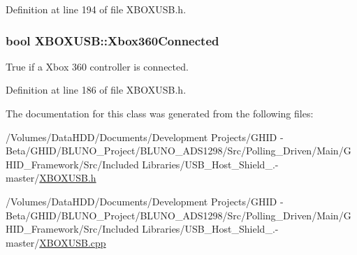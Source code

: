 \-Definition at line 194 of file \-X\-B\-O\-X\-U\-S\-B.\-h.

\hypertarget{class_x_b_o_x_u_s_b_a1c779ae5483a2f73426650242a37d868}{
\subsubsection[{\-Xbox360\-Connected}]{\setlength{\rightskip}{0pt plus 5cm}bool {\bf \-X\-B\-O\-X\-U\-S\-B\-::\-Xbox360\-Connected}}}\label{class_x_b_o_x_u_s_b_a1c779ae5483a2f73426650242a37d868}
\-True if a \-Xbox 360 controller is connected. 

\-Definition at line 186 of file \-X\-B\-O\-X\-U\-S\-B.\-h.



\-The documentation for this class was generated from the following files\-:\begin{DoxyCompactItemize}
\item 
/\-Volumes/\-Data\-H\-D\-D/\-Documents/\-Development Projects/\-G\-H\-I\-D -\/ Beta/\-G\-H\-I\-D/\-B\-L\-U\-N\-O\-\_\-\-Project/\-B\-L\-U\-N\-O\-\_\-\-A\-D\-S1298/\-Src/\-Polling\-\_\-\-Driven/\-Main/\-G\-H\-I\-D\-\_\-\-Framework/\-Src/\-Included Libraries/\-U\-S\-B\-\_\-\-Host\-\_\-\-Shield\-\_.-\/master/\hyperlink{_x_b_o_x_u_s_b_8h}{\-X\-B\-O\-X\-U\-S\-B.\-h}\item 
/\-Volumes/\-Data\-H\-D\-D/\-Documents/\-Development Projects/\-G\-H\-I\-D -\/ Beta/\-G\-H\-I\-D/\-B\-L\-U\-N\-O\-\_\-\-Project/\-B\-L\-U\-N\-O\-\_\-\-A\-D\-S1298/\-Src/\-Polling\-\_\-\-Driven/\-Main/\-G\-H\-I\-D\-\_\-\-Framework/\-Src/\-Included Libraries/\-U\-S\-B\-\_\-\-Host\-\_\-\-Shield\-\_.-\/master/\hyperlink{_x_b_o_x_u_s_b_8cpp}{\-X\-B\-O\-X\-U\-S\-B.\-cpp}\end{DoxyCompactItemize}
